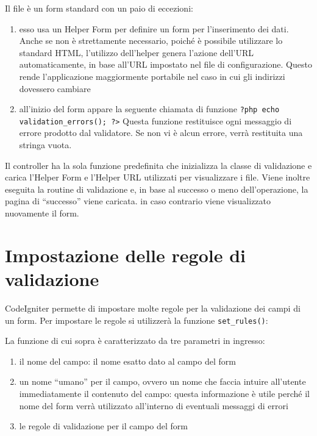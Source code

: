 Il file  è un form standard con un paio di eccezioni:

\begin{enumerate}
\item esso usa un Helper Form per definire un form per l'inserimento dei dati. Anche se non è strettamente necessario, poiché è possibile utilizzare lo standard \ac{HTML}, l'utilizzo dell'helper genera l'azione dell'\ac{URL} automaticamente, in base all'\ac{URL} impostato nel file di configurazione. Questo rende l'applicazione maggiormente portabile nel caso in cui gli indirizzi dovessero cambiare
\item all'inizio del form appare la seguente chiamata di funzione \verb|?php echo validation_errors(); ?>| Questa funzione restituisce ogni messaggio di errore prodotto dal validatore. Se non vi è alcun errore, verrà restituita una stringa vuota.
\end{enumerate}

Il controller  ha la sola funzione predefinita  che inizializza la classe di validazione e carica l'Helper Form e l'Helper URL utilizzati per visualizzare i file. Viene inoltre eseguita la routine di validazione e, in base al successo o meno dell'operazione, la pagina di ``successo'' viene caricata. in caso contrario viene visualizzato nuovamente il form.

\section*{Impostazione delle regole di validazione}
CodeIgniter permette di impostare molte regole per la validazione dei campi di un form. Per impostare le regole si utilizzerà la funzione \verb|set_rules()|:


La funzione di cui sopra è caratterizzato da tre parametri in ingresso:

\begin{enumerate}
\item il nome del campo: il nome esatto dato al campo del form
\item un nome ``umano'' per il campo, ovvero un nome che faccia intuire all'utente immediatamente il contenuto del campo: questa informazione è utile perché il nome del form verrà utilizzato all'interno di eventuali messaggi di errori 
\item le regole di validazione per il campo del form
\end{enumerate}

